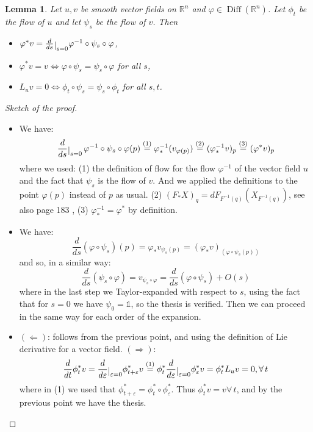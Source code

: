 \documentclass[a4paper,11pt,titlepage, article, oneside]{memoir}
\numberwithin{equation}{section}
\newtheorem{lemma}[theorem]{Lemma}
\theoremstyle{definition}
\theoremstyle{remark}
\DeclareMathOperator{\Diff}{Diff}
\newcommand{\rfield}{\mathbb{R}}
\newcommand{\restrict}[2]{{#1}\raisebox{-.5ex}{$|$}_{#2}}
\begin{document}
\begin{lemma} \label{lemmadiff1}
  Let $u, v$ be smooth vector fields on $\rfield^n$ and $\varphi \in \Diff(\rfield^n)$. Let $\phi_t$ be the flow of $u$ and let $\psi_s$ be the flow of $v$. Then
  \begin{itemize}
    \item $\varphi^*v = \restrict{\frac{d}{ds}}{s=0} \varphi^{-1} \circ \psi_s \circ \varphi$,
    \item $\varphi^*v = v \Leftrightarrow \varphi \circ \psi_s = \psi_s \circ \varphi$ for all $s$,
    \item $L_u v = 0 \Leftrightarrow \phi_t \circ \psi_s = \psi_s \circ \phi_t$ for all $s, t$.
  \end{itemize}
\end{lemma}
\begin{proof}[Sketch of the proof]
$ $
\begin{itemize}
\item We have:
$$\restrict{\frac{d}{ds}}{s=0} \,  \varphi^{-1} \circ \psi_s \circ \varphi (p) \overset{(1)}{=} \varphi^{-1}_* (v_{\varphi(p)}) \overset{(2)}{=} (\varphi_*^{-1} v)_p \overset{(3)}{=} (\varphi^* v)_p$$
where we used: (1) the definition of flow for the flow $\varphi^{-1}$ of the vector field $u$ and the fact that $\psi_s$ is the flow of $v$. And we applied the definitions to the point $\varphi(p)$ instead of $p$ as usual. (2) $(F_*X)_q = dF_{F^{-1}(q)}(X_{F^{-1}(q)})$, see also page 183 , (3) $\varphi_*^{-1} = \varphi^*$ by definition.
\item We have: $$\frac{d}{ds} (\varphi \circ \psi_s)(p) = \varphi_* v_{\psi_s(p)} = (\varphi_* v)_{(\varphi \circ \psi_s(p))}$$
and so, in a similar way:
$$\frac{d}{ds}(\psi_s \circ \varphi) = v_{\psi_s \circ \varphi} = \frac{d}{ds} (\varphi \circ \psi_s) + O(s)$$
where in the last step we Taylor-expanded with respect to $s$, using the fact that for $s=0$ we have $\psi_0 = \mathbb{1}$, so the thesis is verified. Then we can proceed in the same way for each order of the expansion.
\item $(\Leftarrow)$: follows from the previous point, and using the definition of Lie derivative for a vector field. $(\Rightarrow)$:
$$\frac{d}{dt} \phi_t^* v = \restrict{\frac{d}{d\varepsilon}}{\varepsilon=0} \phi^*_{t + \varepsilon} v \overset{(1)}{=} \phi_t^* \restrict{\frac{d}{d \varepsilon}}{\varepsilon=0} \phi^*_{\varepsilon} v = \phi_t^* L_u v = 0, \forall \, t$$
where in (1) we used that $\phi^*_{t + \varepsilon} = \phi_t^* \circ \phi^*_{\varepsilon}$.
Thus $\phi_t^* v = v \forall \, t$, and by the previous point we have the thesis. \qedhere
\end{itemize}
\end{proof}
\end{document}
